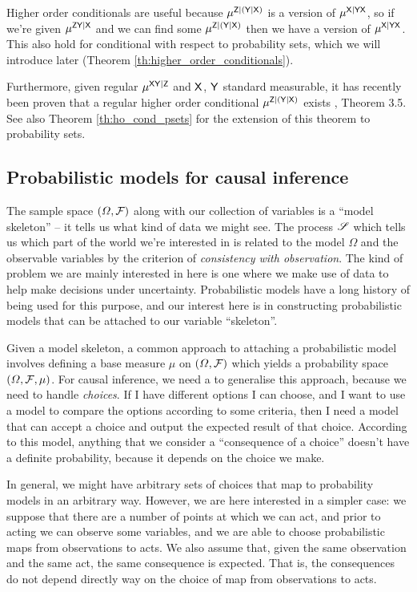 Higher order conditionals are useful because $\mu^{\mathsf{Z}|(\mathsf{Y}|\mathsf{X})}$ is a version of $\mu^{\mathsf{X}|\mathsf{YX}}$, so if we're given $\mu^{\mathsf{ZY}|\mathsf{X}}$ and we can find some $\mu^{\mathsf{Z}|(\mathsf{Y}|\mathsf{X})}$ then we have a version of $\mu^{\mathsf{X}|\mathsf{YX}}$. This also hold for conditional with respect to probability sets, which we will introduce later (Theorem \ref{th:higher_order_conditionals}).

Furthermore, given regular $\mu^{\mathsf{XY}|\mathsf{Z}}$ and $\mathsf{X}$, $\mathsf{Y}$ standard measurable, it has recently been proven that a regular higher order conditional $\mu^{\mathsf{Z}|(\mathsf{Y}|\mathsf{X})}$ exists \citet{bogachev_kantorovich_2020}, Theorem 3.5. See also Theorem \ref{th:ho_cond_psets} for the extension of this theorem to probability sets.

\subsection{Probabilistic models for causal inference}


The sample space $(\Omega,\mathcal{F})$ along with our collection of variables is a ``model skeleton'' -- it tells us what kind of data we might see. The process $\mathscr{S}$ which tells us which part of the world we're interested in is related to the model $\Omega$ and the observable variables by the criterion of \emph{consistency with observation}. The kind of problem we are mainly interested in here is one where we make use of data to help make decisions under uncertainty. Probabilistic models have a long history of being used for this purpose, and our interest here is in constructing probabilistic models that can be attached to our variable ``skeleton''. 

Given a model skeleton, a common approach to attaching a probabilistic model involves defining a base measure $\mu$ on $(\Omega,\mathcal{F})$ which yields a probability space $(\Omega,\mathcal{F},\mu)$. For causal inference, we need a to generalise this approach, because we need to handle \emph{choices}. If I have different options I can choose, and I want to use a model to compare the options according to some criteria, then I need a model that can accept a choice and output the expected result of that choice. According to this model, anything that we consider a ``consequence of a choice'' doesn't have a definite probability, because it depends on the choice we make.

In general, we might have arbitrary sets of choices that map to probability models in an arbitrary way. However, we are here interested in a simpler case: we suppose that there are a number of points at which we can act, and prior to acting we can observe some variables, and we are able to choose probabilistic maps from observations to acts. We also assume that, given the same observation and the same act, the same consequence is expected. That is, the consequences do not depend directly way on the choice of map from observations to acts.

